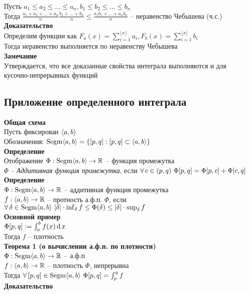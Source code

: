 \documentclass[12pt]{article}
\begin{document}
Пусть $a_1 \leq a_2 \leq \ldots \leq a_n, b_1 \leq b_2 \leq \ldots \leq b_n$\\
Тогда $\frac{a_1 + a_2 + \ldots + a_n}{n}\frac{b_1 + \ldots + b_n}{n} \leq \frac{a_1b_1 + \ldots + a_nb_n}{n}$ -- неравенство Чебышева (ч.с.)\\
\textbf{Доказательство}\\
Определим функции как $F_a(x) = \sum_{i=1}^{\lfloor x \rfloor} a_i, F_b(x) = \sum_{i=1}^{\lfloor x \rfloor} b_i$\\
Тогда неравенство выполняется по неравенству Чебышева\\
\textbf{Замечание}\\
Утверждается, что все доказанные свойства интеграла выполняются и для кусочно-непрерывных функций\\
\subsection{Приложение определенного интеграла}
\textbf{Общая схема}\\
Пусть фиксирован $\langle a, b \rangle$\\
Обозначения: $\operatorname{Segm}\langle a, b \rangle = \{ [p,q]: [p,q] \subset \langle a, b \rangle\}$\\
\textbf{Определение}\\
Отображение $\Phi: \operatorname{Segm}\langle a, b \rangle \rightarrow \mathbb{R}$ -- функция промежутка\\
$\Phi$ -- \textit{Аддитивная функция промежутка}, если $\forall\, c \in (p,q)\ \Phi[p,q] = \Phi[p,c] + \Phi[c,q]$\\
\textbf{Определение}\\
$\Phi: \operatorname{Segm}\langle a, b \rangle \rightarrow \mathbb{R}$ -- аддитивная функция промежутка\\
$f: \langle a, b \rangle \rightarrow \mathbb{R}$ -- протность а.ф.п. $\Phi$, если $\fall \delta \in \nm{Segm}\an ab\ |\delta|\cdot\inf_\delta f \leq \Phi(\delta) \leq |\delta|\cdot\sup_\delta f$\\
\textbf{Основной пример}\\
$\Phi[p,q] := \int_a^b f(x)\operatorname{d} x$\\
Тогда $f$ -- плотность\\
\textbf{Теорема 1 (о вычислении а.ф.п. по плотности)}\\
$\Phi: \operatorname{Segm}\langle a, b \rangle \rightarrow \mathbb{R}$ -- а.ф.п\\
$f: \langle a, b \rangle \rightarrow \mathbb{R}$ -- плотность $\Phi$, непрерывна\\
Тогда $\fall [p,q] \in \nm{Segm}\an ab\ \Phi[p,q] = \int_p^q f$\\
\textbf{Доказательство}\\
\end{document}

